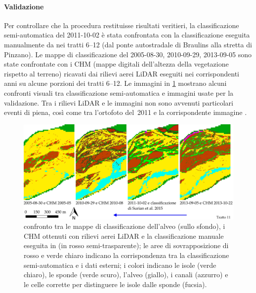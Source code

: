 \paragraph{Validazione}
Per controllare che la procedura restituisse risultati veritieri, la classificazione semi-automatica del 2011-10-02 è stata confrontata con la classificazione eseguita manualmente da  nei tratti \numrange[range-phrase={$\div$}]{6}{12} (dal ponte autostradale di Braulins alla stretta di Pinzano).
Le mappe di classificazione del 2005-08-30, 2010-09-29, 2013-09-05 sono state confrontate con i CHM (mappe digitali dell'altezza della vegetazione rispetto al terreno) ricavati dai rilievi aerei LiDAR eseguiti nei corrispondenti anni su alcune porzioni dei tratti \numrange[range-phrase={$\div$}]{6}{12}.
Le immagini in \cref{fig:validazione-class-is-fl} mostrano alcuni confronti visuali tra classificazione semi-automatica e immagini usate per la validazione.
Tra i rilievi LiDAR e le immagini \AST{} non sono avvenuti particolari eventi di piena, così come tra l'ortofoto del~2011 e la corrispondente immagine \AST{}.
%	
\begin{figure}
	\centering
	\includegraphics[width=\textwidth]{files/class_mia_vs_surian_chm.jpeg}
	\caption[validazione visuale della classificazione dell'alveo]{confronto tra le mappe di classificazione dell'alveo (sullo sfondo), i CHM ottenuti con rilievi aerei LiDAR e la classificazione manuale eseguita in  (in rosso semi-trasparente); le aree di sovrapposizione di rosso e verde chiaro indicano la corrispondenza tra la classificazione semi-automatica e i dati esterni; i colori indicano le isole (verde chiaro), le sponde (verde scuro), l'alveo (giallo), i canali (azzurro) e le celle corrette per distinguere le isole dalle sponde (fucsia).}
	\label{fig:validazione-class-is-fl}
\end{figure}
%

